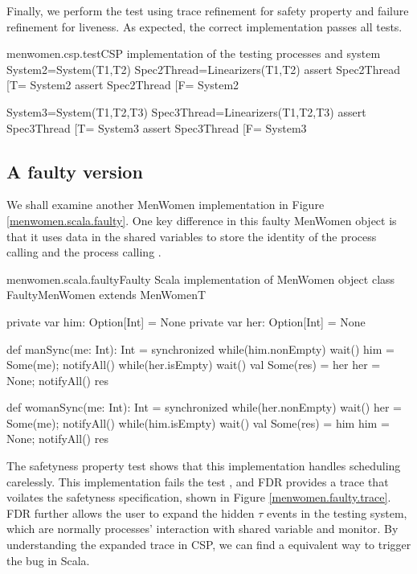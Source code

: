 \documentclass{article}
\begin{document}

Finally, we perform the test using trace refinement for safety property and failure refinement for liveness. As expected, the correct implementation passes all tests. 
\begin{cspinline}{menwomen.csp.test}{CSP implementation of the testing processes and system}
System2=System({T1,T2})
Spec2Thread=Linearizers({T1,T2})
assert Spec2Thread [T= System2
assert Spec2Thread [F= System2

System3=System({T1,T2,T3})
Spec3Thread=Linearizers({T1,T2,T3})
assert Spec3Thread [T= System3
assert Spec3Thread [F= System3
\end{cspinline}

\subsection{A faulty version}
We shall examine another MenWomen implementation in Figure \ref{menwomen.scala.faulty}. One key difference in this faulty MenWomen object is that it uses  data in the shared variables to store the identity of the process calling  and the process calling . 

\begin{scalainline}{menwomen.scala.faulty}{Faulty Scala implementation of MenWomen object}
class FaultyMenWomen extends MenWomenT{
  private var him: Option[Int] = None
  private var her: Option[Int] = None

  def manSync(me: Int): Int = synchronized{
    while(him.nonEmpty) wait()
    him = Some(me); notifyAll()
    while(her.isEmpty) wait()   
    val Some(res) = her
    her = None; notifyAll()
    res
  }

  def womanSync(me: Int): Int = synchronized{
    while(her.nonEmpty) wait()
    her = Some(me); notifyAll()
    while(him.isEmpty) wait()  
    val Some(res) = him
    him = None; notifyAll()
    res
  }
}
\end{scalainline}

The safetyness property test shows that this implementation handles scheduling carelessly. This implementation fails the test \CSPM{Spec2Thread [T= System2}, and FDR provides a trace that voilates the safetyness specification, shown in Figure \ref{menwomen.faulty.trace}. FDR further allows the user to expand the hidden $\tau$ events in the testing system, which are normally processes' interaction with shared variable and monitor. By understanding the expanded trace in CSP, we can find a equivalent way to trigger the bug in Scala.
\end{document}
